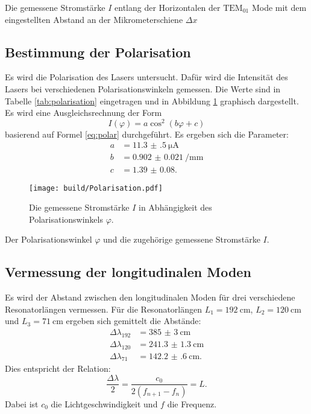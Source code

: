 \begin{table}
	\centering
	\caption{Die gemessene Stromstärke $I$ entlang der Horizontalen der $\text{TEM}_{\text{01}}$ Mode mit dem eingestellten Abstand an der Mikrometerschiene $\Delta x$}
	
	
	\label{tab:T01}
\end{table}

\subsection{Bestimmung der Polarisation}

Es wird die Polarisation des Lasers untersucht. Dafür wird die Intensität des Lasers bei verschiedenen Polarisationswinkeln gemessen. Die Werte sind in Tabelle \ref{tab:polarisation} eingetragen und in Abbildung \ref{fig:polarisation} graphisch dargestellt. 
Es wird eine Ausgleichsrechnung der Form
\[
I(\varphi) = a\cos^2\left(b\varphi+c\right)
\] 
basierend auf Formel \eqref{eq:polar} durchgeführt.
Es ergeben sich die Parameter:
\begin{align*}
a &= \SI{11.3(5)}{\micro\ampere}\\
b &= \SI{0.902(21)}{\per\milli\metre}\\
c &= \num{1.39(8)}\text{.}
\end{align*}

\begin{figure}
	\centering
	\texttt{[image: build/Polarisation.pdf]}
	\caption{Die gemessene Stromstärke $I$ in Abhängigkeit des Polarisationswinkels $\varphi$.}
	\label{fig:polarisation}
\end{figure}

\begin{table}
	\centering
	\caption{Der Polarisationswinkel $\varphi$ und die zugehörige gemessene Stromstärke $I$.}
	
	\label{tab:polarisation}
\end{table}

\subsection{Vermessung der longitudinalen Moden}

Es wird der Abstand zwischen den longitudinalen Moden für drei verschiedene Resonatorlängen vermessen.
Für die Resonatorlängen $L_1=\SI{192}{\centi\metre}$, $L_2=\SI{120}{\centi\metre}$ und $L_3=\SI{71}{\centi\metre}$ ergeben sich gemittelt die Abstände:
\begin{align*}
\Delta\lambda_{192} &= \SI{385(3)}{\centi\metre}\\
\Delta\lambda_{120} &= \SI{241.3(13)}{\centi\metre}\\
\Delta\lambda_{71} &= \SI{142.2(6)}{\centi\metre}\text{.}
\end{align*}
Dies entspricht der Relation:
\[
\frac{\Delta\lambda}{2} = \frac{c_0}{2(f_{n+1}-f_n)} = L \text{.}
\]
Dabei ist $c_0$ die Lichtgeschwindigkeit und $f$ die Frequenz.

